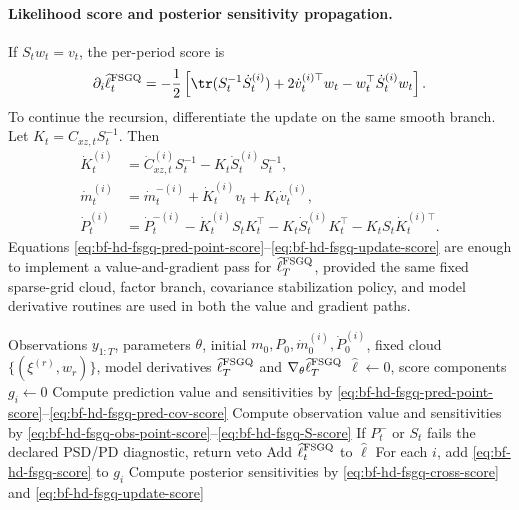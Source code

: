 \paragraph{Likelihood score and posterior sensitivity propagation.}
If \(S_tw_t=v_t\), the per-period score is
\begin{equation}
  \partial_i\widehat\ell_t^{\rm FSGQ}
  =
  -\frac12
  \left[
    \tr(S_t^{-1}\dot S_t^{(i)})
    +2\dot v_t^{(i)\top}w_t
    -w_t^\top\dot S_t^{(i)}w_t
  \right].
  \label{eq:bf-hd-fsgq-score}
\end{equation}
To continue the recursion, differentiate the update on the same smooth branch.
Let \(K_t=C_{xz,t}S_t^{-1}\).  Then
\begin{align}
  \dot K_t^{(i)}
  &=
  \dot C_{xz,t}^{(i)}S_t^{-1}
  -K_t\dot S_t^{(i)}S_t^{-1},\\
  \dot m_t^{(i)}
  &=
  \dot m_t^{-(i)}
  +\dot K_t^{(i)}v_t
  +K_t\dot v_t^{(i)},\\
  \dot P_t^{(i)}
  &=
  \dot P_t^{-(i)}
  -\dot K_t^{(i)}S_tK_t^\top
  -K_t\dot S_t^{(i)}K_t^\top
  -K_tS_t\dot K_t^{(i)\top}.
  \label{eq:bf-hd-fsgq-update-score}
\end{align}
Equations \eqref{eq:bf-hd-fsgq-pred-point-score}--\eqref{eq:bf-hd-fsgq-update-score}
are enough to implement a value-and-gradient pass for
\(\widehat\ell_T^{\rm FSGQ}\), provided the same fixed sparse-grid cloud,
factor branch, covariance stabilization policy, and model derivative routines
are used in both the value and gradient paths.

\begin{algorithm}
\caption{FixedSparseGridValueAndScore}
\label{alg:bf-hd-fsgq-score}
\begin{algorithmic}[1]
\Require Observations \(y_{1:T}\), parameters \(\theta\), initial
\(m_0,P_0,\dot m_0^{(i)},\dot P_0^{(i)}\), fixed cloud
\(\{(\xi^{(r)},w_r)\}\), model derivatives
\Ensure \(\widehat\ell_T^{\rm FSGQ}\) and \(\nabla_\theta\widehat\ell_T^{\rm FSGQ}\)
\State \(\widehat\ell\gets0\), score components \(g_i\gets0\)
  \State Compute prediction value and sensitivities by
  \eqref{eq:bf-hd-fsgq-pred-point-score}--\eqref{eq:bf-hd-fsgq-pred-cov-score}
  \State Compute observation value and sensitivities by
  \eqref{eq:bf-hd-fsgq-obs-point-score}--\eqref{eq:bf-hd-fsgq-S-score}
  \State If \(P_t^-\) or \(S_t\) fails the declared PSD/PD diagnostic, return veto
  \State Add \(\widehat\ell_t^{\rm FSGQ}\) to \(\widehat\ell\)
  \State For each \(i\), add \eqref{eq:bf-hd-fsgq-score} to \(g_i\)
  \State Compute posterior sensitivities by \eqref{eq:bf-hd-fsgq-cross-score}
  and \eqref{eq:bf-hd-fsgq-update-score}
\EndFor
\end{algorithmic}
\end{algorithm}

